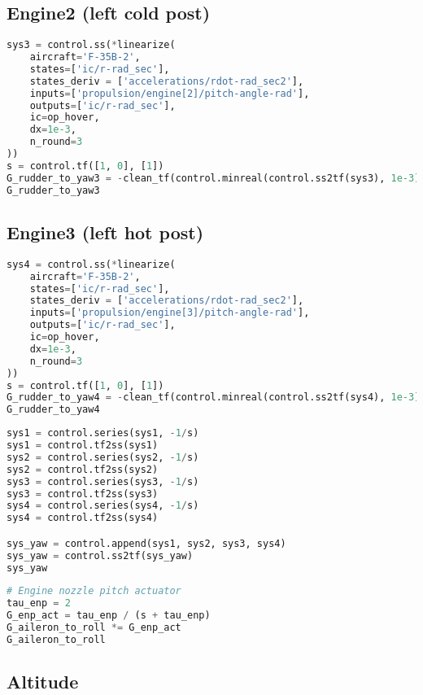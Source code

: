 \hypertarget{engine2-left-cold-post}{%
\subsection{Engine2 (left cold post)}\label{engine2-left-cold-post}}

\begin{lstlisting}[language=Python]
sys3 = control.ss(*linearize(
    aircraft='F-35B-2',
    states=['ic/r-rad_sec'],
    states_deriv = ['accelerations/rdot-rad_sec2'],
    inputs=['propulsion/engine[2]/pitch-angle-rad'],
    outputs=['ic/r-rad_sec'],
    ic=op_hover,
    dx=1e-3,
    n_round=3
))
s = control.tf([1, 0], [1])
G_rudder_to_yaw3 = -clean_tf(control.minreal(control.ss2tf(sys3), 1e-3))/s
G_rudder_to_yaw3
\end{lstlisting}

\hypertarget{engine3-left-hot-post}{%
\subsection{Engine3 (left hot post)}\label{engine3-left-hot-post}}

\begin{lstlisting}[language=Python]
sys4 = control.ss(*linearize(
    aircraft='F-35B-2',
    states=['ic/r-rad_sec'],
    states_deriv = ['accelerations/rdot-rad_sec2'],
    inputs=['propulsion/engine[3]/pitch-angle-rad'],
    outputs=['ic/r-rad_sec'],
    ic=op_hover,
    dx=1e-3,
    n_round=3
))
s = control.tf([1, 0], [1])
G_rudder_to_yaw4 = -clean_tf(control.minreal(control.ss2tf(sys4), 1e-3))/s
G_rudder_to_yaw4
\end{lstlisting}

\begin{lstlisting}[language=Python]
sys1 = control.series(sys1, -1/s)
sys1 = control.tf2ss(sys1)
sys2 = control.series(sys2, -1/s)
sys2 = control.tf2ss(sys2)
sys3 = control.series(sys3, -1/s)
sys3 = control.tf2ss(sys3)
sys4 = control.series(sys4, -1/s)
sys4 = control.tf2ss(sys4)

sys_yaw = control.append(sys1, sys2, sys3, sys4)
sys_yaw = control.ss2tf(sys_yaw)
sys_yaw
\end{lstlisting}

\begin{lstlisting}[language=Python]
# Engine nozzle pitch actuator 
tau_enp = 2
G_enp_act = tau_enp / (s + tau_enp)
G_aileron_to_roll *= G_enp_act
G_aileron_to_roll
\end{lstlisting}

\hypertarget{altitude}{%
\subsection{Altitude}\label{altitude}}

